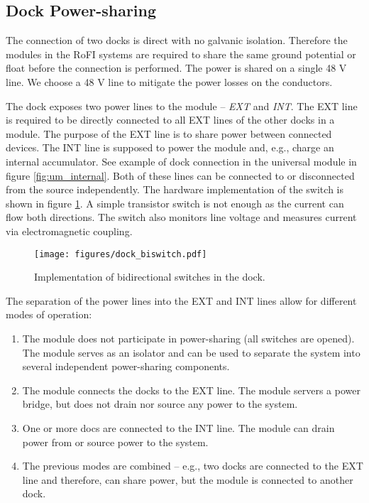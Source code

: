 \subsection{Dock Power-sharing}

The connection of two docks is direct with no galvanic isolation. Therefore the
modules in the RoFI systems are required to share the same ground potential or
float before the connection is performed. The power is shared on a single 48 V
line. We choose a 48 V line to mitigate the power losses on the conductors.

The dock exposes two power lines to the module -- \emph{EXT} and \emph{INT}. The
EXT line is required to be directly connected to all EXT lines of the other
docks in a module. The purpose of the EXT line is to share power between
connected devices. The INT line is supposed to power the module and, e.g.,
charge an internal accumulator. See example of dock connection in the universal
module in figure \ref{fig:um_internal}. Both of these lines can be connected
to or disconnected from the source independently. The hardware implementation of
the switch is shown in figure \ref{fig:dock_biswitch}. A simple transistor
switch is not enough as the current can flow both directions. The switch also
monitors line voltage and measures current via electromagnetic coupling.

\begin{figure}[t]
    \centering
    \texttt{[image: figures/dock\_biswitch.pdf]}
    \caption{Implementation of bidirectional switches in the dock.}
    \label{fig:dock_biswitch}
\end{figure}

The separation of the power lines into the EXT and INT lines allow for
different modes of operation:
\begin{enumerate}
    \item The module does not participate in power-sharing (all switches are
    opened). The module serves as an isolator and can be used to separate
    the system into several independent power-sharing components.
    \item The module connects the docks to the EXT line. The module servers a
    power bridge, but does not drain nor source any power to the system.
    \item One or more docs are connected to the INT line. The module can drain
    power from or source power to the system.
    \item The previous modes are combined -- e.g., two docks are connected to the
    EXT line and therefore, can share power, but the module is connected to
    another dock.
\end{enumerate}

